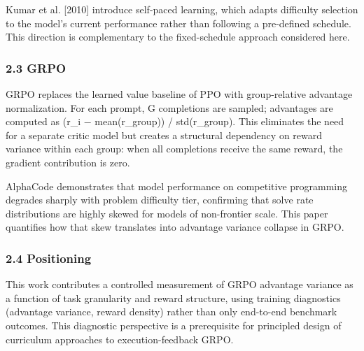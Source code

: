Kumar et al. [2010] introduce self-paced learning, which adapts difficulty selection to the model's current performance rather than following a pre-defined schedule. This direction is complementary to the fixed-schedule approach considered here.

\subsubsection{2.3 GRPO}

GRPO \citep{Shaoetal2024} replaces the learned value baseline of PPO \citep{Schulmanetal2017} with group-relative advantage normalization. For each prompt, G completions are sampled; advantages are computed as (r_i − mean(r_group)) / std(r_group). This eliminates the need for a separate critic model but creates a structural dependency on reward variance within each group: when all completions receive the same reward, the gradient contribution is zero.

AlphaCode \citep{Lietal2022} demonstrates that model performance on competitive programming degrades sharply with problem difficulty tier, confirming that solve rate distributions are highly skewed for models of non-frontier scale. This paper quantifies how that skew translates into advantage variance collapse in GRPO.

\subsubsection{2.4 Positioning}

This work contributes a controlled measurement of GRPO advantage variance as a function of task granularity and reward structure, using training diagnostics (advantage variance, reward density) rather than only end-to-end benchmark outcomes. This diagnostic perspective is a prerequisite for principled design of curriculum approaches to execution-feedback GRPO.
